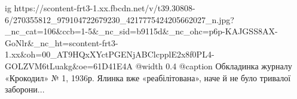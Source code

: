  
 
 
 
 

\ifcmt
  ig https://scontent-frt3-1.xx.fbcdn.net/v/t39.30808-6/270355812_979104722679230_4217775424205662027_n.jpg?_nc_cat=106&ccb=1-5&_nc_sid=b9115d&_nc_ohc=p6p-KAJGSS8AX-GoNlr&_nc_ht=scontent-frt3-1.xx&oh=00_AT9HQxXYctPGENjABClcpplE2x8f0PL4-GOLZVM6tLuakg&oe=61D41E4A
  @width 0.4
	@caption Обкладинка журналу «Крокодил» № 1, 1936р. Ялинка вже «реабілітована», наче й не було тривалої заборони...
\fi
